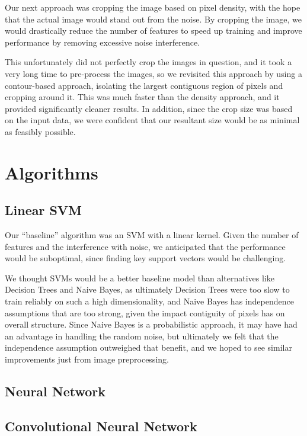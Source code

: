 \documentclass[conference]{IEEEtran}
\begin{document}
Our next approach was cropping the image based on pixel density, with the hope that the actual image would stand out from the noise. By cropping the image, we would drastically reduce the number of features to speed up training and improve performance by removing excessive noise interference.

This unfortunately did not perfectly crop the images in question, and it took a very long time to pre-process the images, so we revisited this approach by using a contour-based approach, isolating the largest contiguous region of pixels and cropping around it. This was much faster than the density approach, and it provided significantly cleaner results. In addition, since the crop size was based on the input data, we were confident that our resultant size would be as minimal as feasibly possible.

\section{Algorithms}

\subsection{Linear SVM}

Our ``baseline'' algorithm was an SVM with a linear kernel. Given the number of features and the interference with noise, we anticipated that the performance would be suboptimal, since finding key support vectors would be challenging.

We thought SVMs would be a better baseline model than alternatives like Decision Trees and Naive Bayes, as ultimately Decision Trees were too slow to train reliably on such a high dimensionality, and Naive Bayes has independence assumptions that are too strong, given the impact contiguity of pixels has on overall structure. Since Naive Bayes is a probabilistic approach, it may have had an advantage in handling the random noise, but ultimately we felt that the independence assumption outweighed that benefit, and we hoped to see similar improvements just from image preprocessing.

\subsection{Neural Network}

\subsection{Convolutional Neural Network}
\end{document}
